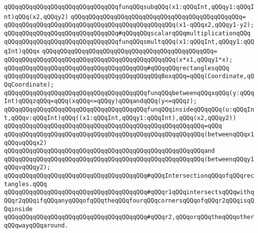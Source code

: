 \verb|qQQqqQQqqQQqqQQqqQQqqQQqqQQqqQQqfunqQQqsubqQQq(x1:qQQqInt,qQQqy1:qQQqInt)qQQq(x2,qQQqy2)|\newline
\verb|qQQqqQQqqQQqqQQqqQQqqQQqqQQqqQQqqQQqqQQqqQQqqQQq=|\newline
\verb|qQQqqQQqqQQqqQQqqQQqqQQqqQQqqQQqqQQqqQQqqQQqqQQq(x1-qQQqx2,qQQqy1-y2);|\newline
\newline
\verb|qQQqqQQqqQQqqQQqqQQqqQQqqQQqqQQq#qQQqqQQqscalarqQQqmultiplicationqQQq|\newline
\verb|qQQqqQQqqQQqqQQqqQQqqQQqqQQqqQQqfunqQQqsmultqQQq(x1:qQQqInt,qQQqy1:qQQqInt)qQQqx|\newline
\verb|qQQqqQQqqQQqqQQqqQQqqQQqqQQqqQQqqQQqqQQqqQQqqQQq=|\newline
\verb|qQQqqQQqqQQqqQQqqQQqqQQqqQQqqQQqqQQqqQQqqQQqqQQq(x*x1,qQQqy1*x);|\newline
\newline
\verb|qQQqqQQqqQQqqQQqqQQqqQQqqQQqqQQqqQQqqQQq#qQQqqQQqrectanglesqQQq|\newline
\verb|qQQqqQQqqQQqqQQqqQQqqQQqqQQqqQQqqQQqqQQqqQQqBoxqQQq=qQQq(Coordinate,qQQqCoordinate);|\newline
\newline
\verb|qQQqqQQqqQQqqQQqqQQqqQQqqQQqqQQqqQQqqQQqfunqQQqbetweenqQQqxqQQq(y:qQQqInt)qQQqzqQQq=qQQq(xqQQq<=qQQqy)qQQqandqQQq(y<=qQQqz);|\newline
\newline
\verb|qQQqqQQqqQQqqQQqqQQqqQQqqQQqqQQqqQQqqQQqfunqQQqinsideqQQqqQQq(u:qQQqInt,qQQqv:qQQqInt)qQQq((x1:qQQqInt,qQQqy1:qQQqInt),qQQq(x2,qQQqy2))|\newline
\verb|qQQqqQQqqQQqqQQqqQQqqQQqqQQqqQQqqQQqqQQqqQQqqQQqqQQqqQQq=qQQq|\newline
\verb|qQQqqQQqqQQqqQQqqQQqqQQqqQQqqQQqqQQqqQQqqQQqqQQqqQQqqQQq(betweenqQQqx1qQQquqQQqx2)|\newline
\verb|qQQqqQQqqQQqqQQqqQQqqQQqqQQqqQQqqQQqqQQqqQQqqQQqqQQqqQQqand|\newline
\verb|qQQqqQQqqQQqqQQqqQQqqQQqqQQqqQQqqQQqqQQqqQQqqQQqqQQqqQQq(betweenqQQqy1qQQqvqQQqy2);|\newline
\newline
\verb|qQQqqQQqqQQqqQQqqQQqqQQqqQQqqQQqqQQqqQQq#qQQqIntersectionqQQqofqQQqrectangles.qQQq|\newline
\verb|qQQqqQQqqQQqqQQqqQQqqQQqqQQqqQQqqQQqqQQq#qQQqr1qQQqintersectsqQQqwithqQQqr2qQQqifqQQqanyqQQqofqQQqtheqQQqfourqQQqcornersqQQqofqQQqr2qQQqisqQQqinside|\newline
\verb|qQQqqQQqqQQqqQQqqQQqqQQqqQQqqQQqqQQqqQQq#qQQqr2,qQQqorqQQqtheqQQqotherqQQqwayqQQqaround.|\newline
